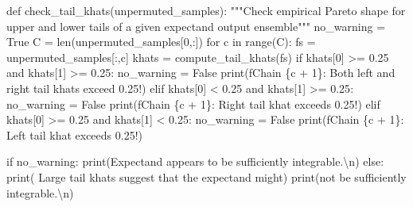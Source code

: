 \documentclass[
  letterpaper,
  DIV=11,
  numbers=noendperiod]{scrartcl}
\newenvironment{Shaded}{\begin{snugshade}}{\end{snugshade}}
\newcommand{\BuiltInTok}[1]{\textcolor[rgb]{0.00,0.23,0.31}{#1}}
\newcommand{\CharTok}[1]{\textcolor[rgb]{0.13,0.47,0.30}{#1}}
\newcommand{\CommentTok}[1]{\textcolor[rgb]{0.37,0.37,0.37}{#1}}
\newcommand{\ControlFlowTok}[1]{\textcolor[rgb]{0.00,0.23,0.31}{#1}}
\newcommand{\DecValTok}[1]{\textcolor[rgb]{0.68,0.00,0.00}{#1}}
\newcommand{\FloatTok}[1]{\textcolor[rgb]{0.68,0.00,0.00}{#1}}
\newcommand{\KeywordTok}[1]{\textcolor[rgb]{0.00,0.23,0.31}{#1}}
\newcommand{\NormalTok}[1]{\textcolor[rgb]{0.00,0.23,0.31}{#1}}
\newcommand{\OperatorTok}[1]{\textcolor[rgb]{0.37,0.37,0.37}{#1}}
\newcommand{\SpecialCharTok}[1]{\textcolor[rgb]{0.37,0.37,0.37}{#1}}
\newcommand{\SpecialStringTok}[1]{\textcolor[rgb]{0.13,0.47,0.30}{#1}}
\newcommand{\StringTok}[1]{\textcolor[rgb]{0.13,0.47,0.30}{#1}}
\newcommand{\VariableTok}[1]{\textcolor[rgb]{0.07,0.07,0.07}{#1}}
\begin{document}
\begin{Shaded}
\begin{Highlighting}[]
\KeywordTok{def}\NormalTok{ check\_tail\_khats(unpermuted\_samples):}
  \CommentTok{"""Check empirical Pareto shape for upper and lower tails of a}
\CommentTok{     given expectand output ensemble"""}
\NormalTok{  no\_warning }\OperatorTok{=} \VariableTok{True}
\NormalTok{  C }\OperatorTok{=} \BuiltInTok{len}\NormalTok{(unpermuted\_samples[}\DecValTok{0}\NormalTok{,:])}
  \ControlFlowTok{for}\NormalTok{ c }\KeywordTok{in} \BuiltInTok{range}\NormalTok{(C):}
\NormalTok{    fs }\OperatorTok{=}\NormalTok{ unpermuted\_samples[:,c]}
\NormalTok{    khats }\OperatorTok{=}\NormalTok{ compute\_tail\_khats(fs)}
    \ControlFlowTok{if}\NormalTok{ khats[}\DecValTok{0}\NormalTok{] }\OperatorTok{\textgreater{}=} \FloatTok{0.25} \KeywordTok{and}\NormalTok{ khats[}\DecValTok{1}\NormalTok{] }\OperatorTok{\textgreater{}=} \FloatTok{0.25}\NormalTok{:}
\NormalTok{      no\_warning }\OperatorTok{=} \VariableTok{False}
      \BuiltInTok{print}\NormalTok{(}\SpecialStringTok{f\textquotesingle{}Chain }\SpecialCharTok{\{}\NormalTok{c }\OperatorTok{+} \DecValTok{1}\SpecialCharTok{\}}\SpecialStringTok{: Both left and right tail khats exceed 0.25!\textquotesingle{}}\NormalTok{)}
    \ControlFlowTok{elif}\NormalTok{ khats[}\DecValTok{0}\NormalTok{] }\OperatorTok{\textless{}} \FloatTok{0.25} \KeywordTok{and}\NormalTok{ khats[}\DecValTok{1}\NormalTok{] }\OperatorTok{\textgreater{}=} \FloatTok{0.25}\NormalTok{:}
\NormalTok{      no\_warning }\OperatorTok{=} \VariableTok{False}
      \BuiltInTok{print}\NormalTok{(}\SpecialStringTok{f\textquotesingle{}Chain }\SpecialCharTok{\{}\NormalTok{c }\OperatorTok{+} \DecValTok{1}\SpecialCharTok{\}}\SpecialStringTok{: Right tail khat exceeds 0.25!\textquotesingle{}}\NormalTok{)}
    \ControlFlowTok{elif}\NormalTok{ khats[}\DecValTok{0}\NormalTok{] }\OperatorTok{\textgreater{}=} \FloatTok{0.25} \KeywordTok{and}\NormalTok{ khats[}\DecValTok{1}\NormalTok{] }\OperatorTok{\textless{}} \FloatTok{0.25}\NormalTok{:}
\NormalTok{      no\_warning }\OperatorTok{=} \VariableTok{False}
      \BuiltInTok{print}\NormalTok{(}\SpecialStringTok{f\textquotesingle{}Chain }\SpecialCharTok{\{}\NormalTok{c }\OperatorTok{+} \DecValTok{1}\SpecialCharTok{\}}\SpecialStringTok{: Left tail khat exceeds 0.25!\textquotesingle{}}\NormalTok{)}
  
  \ControlFlowTok{if}\NormalTok{ no\_warning:}
    \BuiltInTok{print}\NormalTok{(}\StringTok{\textquotesingle{}Expectand appears to be sufficiently integrable.}\CharTok{\textbackslash{}n}\StringTok{\textquotesingle{}}\NormalTok{)}
  \ControlFlowTok{else}\NormalTok{:}
    \BuiltInTok{print}\NormalTok{(}\StringTok{\textquotesingle{}  Large tail khats suggest that the expectand might\textquotesingle{}}\NormalTok{)}
    \BuiltInTok{print}\NormalTok{(}\StringTok{\textquotesingle{}not be sufficiently integrable.}\CharTok{\textbackslash{}n}\StringTok{\textquotesingle{}}\NormalTok{)}
\end{Highlighting}
\end{Shaded}
\end{document}
